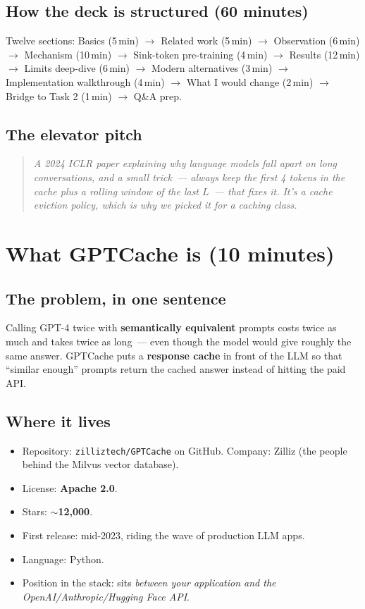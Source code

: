 \documentclass[11pt,a4paper]{article}
\begin{document}
\subsection{How the deck is structured (60 minutes)}
Twelve sections: Basics (5\,min) $\to$ Related work (5\,min) $\to$
Observation (6\,min) $\to$ Mechanism (10\,min) $\to$ Sink-token
pre-training (4\,min) $\to$ Results (12\,min) $\to$ Limits deep-dive
(6\,min) $\to$ Modern alternatives (3\,min) $\to$ Implementation
walkthrough (4\,min) $\to$ What I would change (2\,min) $\to$ Bridge to
Task 2 (1\,min) $\to$ Q\&A prep.

\subsection{The elevator pitch}
\begin{quote}\itshape
A 2024 ICLR paper explaining why language models fall apart on long
conversations, and a small trick~--- always keep the first 4 tokens in
the cache plus a rolling window of the last $L$~--- that fixes it. It's a
cache eviction policy, which is why we picked it for a caching class.
\end{quote}

\section{What GPTCache is (10 minutes)}

\subsection{The problem, in one sentence}
Calling GPT-4 twice with \textbf{semantically equivalent} prompts costs
twice as much and takes twice as long~--- even though the model would
give roughly the same answer. GPTCache puts a \textbf{response cache} in
front of the LLM so that ``similar enough'' prompts return the cached
answer instead of hitting the paid API.

\subsection{Where it lives}
\begin{itemize}[leftmargin=1.5em,itemsep=0.1em]
  \item Repository: \texttt{zilliztech/GPTCache} on GitHub. Company:
        Zilliz (the people behind the Milvus vector database).
  \item License: \textbf{Apache 2.0}.
  \item Stars: $\sim$\textbf{12{,}000}.
  \item First release: mid-2023, riding the wave of production LLM apps.
  \item Language: Python.
  \item Position in the stack: sits \emph{between your application and
        the OpenAI/Anthropic/Hugging Face API}.
\end{itemize}
\end{document}
